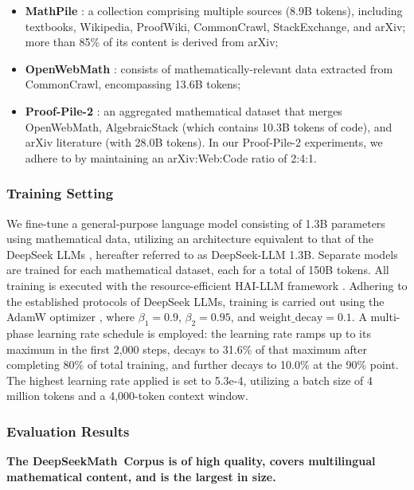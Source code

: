 \begin{itemize}[topsep=0pt]
\begin{itemize}[topsep=0pt]
    \item \textbf{MathPile} \citep{mathpile}: a collection comprising multiple sources (8.9B tokens), including textbooks, Wikipedia, ProofWiki, CommonCrawl, StackExchange, and arXiv; more than 85\% of its content is derived from arXiv;
    \item \textbf{OpenWebMath} \citep{openwebmath}: consists of mathematically-relevant data extracted from CommonCrawl, encompassing 13.6B tokens;
    \item \textbf{Proof-Pile-2} \citep{llemma}: an aggregated mathematical dataset that merges OpenWebMath, AlgebraicStack (which contains 10.3B tokens of code), and arXiv literature (with 28.0B tokens). In our Proof-Pile-2 experiments, we adhere to \cite{llemma} by maintaining an arXiv:Web:Code ratio of 2:4:1.
\end{itemize}

\subsubsection{Training Setting}
\label{sec:quality-policy}
We fine-tune a general-purpose language model consisting of 1.3B parameters using mathematical data, utilizing an architecture equivalent to that of the DeepSeek LLMs \citep{deepseek-llm}, hereafter referred to as DeepSeek-LLM 1.3B. Separate models are trained for each mathematical dataset, each for a total of 150B tokens. All training is executed with the resource-efficient HAI-LLM framework \citep{haillm}. Adhering to the established protocols of DeepSeek LLMs, training is carried out using the AdamW optimizer \citep{adamW}, where $\beta_1=0.9$, $\beta_2=0.95$, and $\mathrm{weight\_decay}=0.1$. A multi-phase learning rate schedule is employed: the learning rate ramps up to its maximum in the first 2,000 steps, decays to 31.6\% of that maximum after completing 80\% of total training, and further decays to 10.0\% at the 90\% point. The highest learning rate applied is set to 5.3e-4, utilizing a batch size of 4 million tokens and a 4,000-token context window.

\subsubsection{Evaluation Results}

\textbf{The DeepSeekMath~Corpus is of high quality, covers multilingual mathematical content, and is the largest in size.}


\end{itemize}
